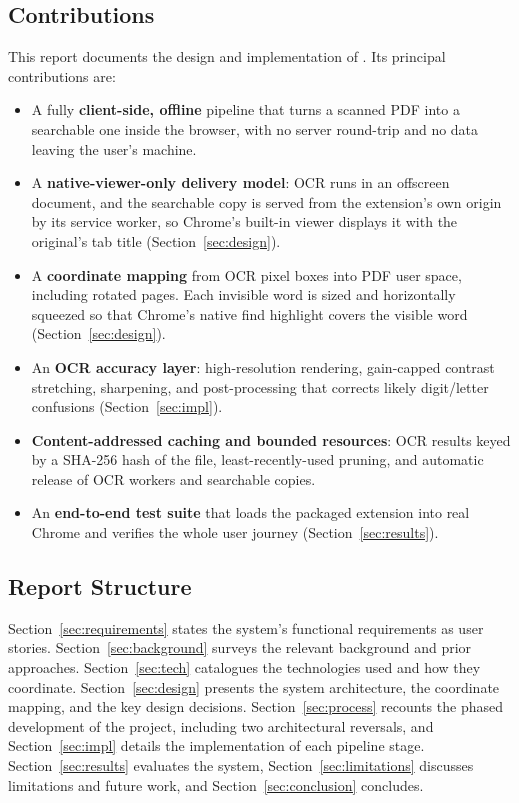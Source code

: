 \subsection{Contributions}
This report documents the design and implementation of \proj{}. Its principal
contributions are:

\begin{itemize}
  \item A fully \textbf{client-side, offline} pipeline that turns a scanned PDF
        into a searchable one inside the browser, with no server round-trip and
        no data leaving the user's machine.
  \item A \textbf{native-viewer-only delivery model}: OCR runs in an offscreen
        document, and the searchable copy is served from the extension's own
        origin by its service worker, so Chrome's built-in viewer displays it
        with the original's tab title (Section~\ref{sec:design}).
  \item A \textbf{coordinate mapping} from OCR pixel boxes into PDF user space,
        including rotated pages. Each invisible word is sized and horizontally
        squeezed so that Chrome's native find highlight covers the visible word
        (Section~\ref{sec:design}).
  \item An \textbf{OCR accuracy layer}: high-resolution rendering, gain-capped
        contrast stretching, sharpening, and post-processing that corrects
        likely digit/letter confusions (Section~\ref{sec:impl}).
  \item \textbf{Content-addressed caching and bounded resources}: OCR results
        keyed by a SHA-256 hash of the file, least-recently-used pruning, and
        automatic release of OCR workers and searchable copies.
  \item An \textbf{end-to-end test suite} that loads the packaged extension into
        real Chrome and verifies the whole user journey
        (Section~\ref{sec:results}).
\end{itemize}

\subsection{Report Structure}
Section~\ref{sec:requirements} states the system's functional requirements as
user stories. Section~\ref{sec:background} surveys the relevant background and
prior approaches. Section~\ref{sec:tech} catalogues the technologies used and how
they coordinate. Section~\ref{sec:design} presents the system architecture, the
coordinate mapping, and the key design decisions. Section~\ref{sec:process}
recounts the phased development of the project, including two architectural
reversals, and Section~\ref{sec:impl} details the implementation of each pipeline
stage. Section~\ref{sec:results} evaluates the system,
Section~\ref{sec:limitations} discusses limitations and future work, and
Section~\ref{sec:conclusion} concludes.

